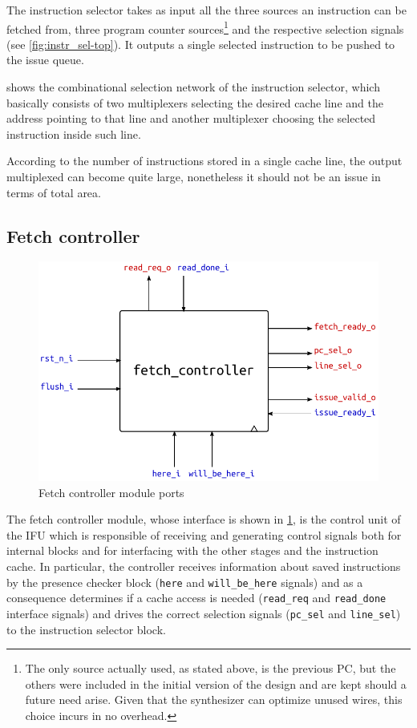 The instruction selector takes as input all the three sources an instruction can be fetched from, three program counter sources\footnote{The only source actually used, as stated above, is the previous \ac{PC}, but the others were included in the initial version of the design and are kept should a future need arise. Given that the synthesizer can optimize unused wires, this choice incurs in no overhead.} and the respective selection signals (see \cref{fig:instr_sel-top}). It outputs a single selected instruction to be pushed to the issue queue.

 shows the combinational selection network of the instruction selector, which basically consists of two multiplexers selecting the desired cache line and the address pointing to that line and another multiplexer choosing the selected instruction inside such line.

According to the number of instructions stored in a single cache line, the output multiplexed can become quite large, nonetheless it should not be an issue in terms of total area.

\subsection{Fetch controller}
\begin{figure}[hbt]
  \centering
  \includegraphics{img/fetch_controller-top.pdf}
  \caption{Fetch controller module ports}
  \label{fig:fetch_controller-top}
\end{figure}
The fetch controller module, whose interface is shown in \cref{fig:fetch_controller-top}, is the control unit of the \ac{IFU} which is responsible of receiving and generating control signals both for internal blocks and for interfacing with the other stages and the instruction cache. In particular, the controller receives information about saved instructions by the presence checker block (\texttt{here} and \texttt{will\_be\_here} signals) and as a consequence determines if a cache access is needed (\texttt{read\_req} and \texttt{read\_done} interface signals) and drives the correct selection signals (\texttt{pc\_sel} and \texttt{line\_sel}) to the instruction selector block.

